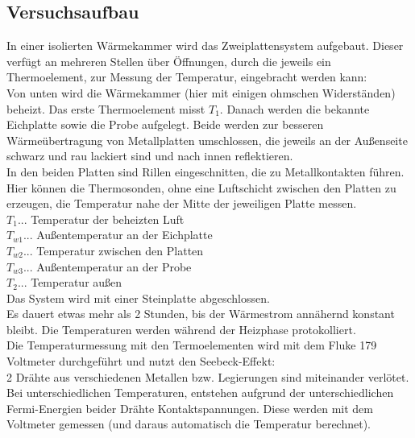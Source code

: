 \documentclass[12pt,a4paper]{article}
\begin{document}
\begin{multicols}{2}
\subsection{Versuchsaufbau}
In einer isolierten Wärmekammer wird das Zweiplattensystem aufgebaut. Dieser verfügt an mehreren Stellen über Öffnungen, durch die jeweils ein Thermoelement, zur Messung der Temperatur, eingebracht werden kann:\\
Von unten wird die Wärmekammer (hier mit einigen ohmschen Widerständen) beheizt. Das erste Thermoelement misst $T_1$.
Danach werden die bekannte Eichplatte sowie die Probe aufgelegt. Beide werden zur besseren Wärmeübertragung von Metallplatten umschlossen, die jeweils an der Außenseite schwarz und rau lackiert sind und nach innen reflektieren.\\
In den beiden Platten sind Rillen eingeschnitten, die zu Metallkontakten führen. Hier können die Thermosonden, ohne eine Luftschicht zwischen den Platten zu erzeugen, die Temperatur nahe der Mitte der jeweiligen Platte messen.\\

\noindent  $T_1$... Temperatur der beheizten Luft\\
$T_{w1}$... Außentemperatur an der Eichplatte\\
$T_{w2}$... Temperatur zwischen den Platten\\
$T_{w3}$... Außentemperatur an der Probe\\
$T_2$... Temperatur außen\\

\noindent Das System wird mit einer Steinplatte abgeschlossen.\\
Es dauert etwas mehr als 2 Stunden, bis der Wärmestrom annähernd konstant bleibt. Die Temperaturen werden während der Heizphase protokolliert.\\

\noindent Die Temperaturmessung mit den Termoelementen wird mit dem Fluke 179 Voltmeter durchgeführt und nutzt den Seebeck-Effekt:\\
2 Drähte aus verschiedenen Metallen bzw. Legierungen sind miteinander verlötet. Bei unterschiedlichen Temperaturen, entstehen aufgrund der unterschiedlichen Fermi-Energien beider Drähte Kontaktspannungen. Diese werden mit dem Voltmeter gemessen (und daraus automatisch die Temperatur berechnet).

\end{multicols}
\end{document}
